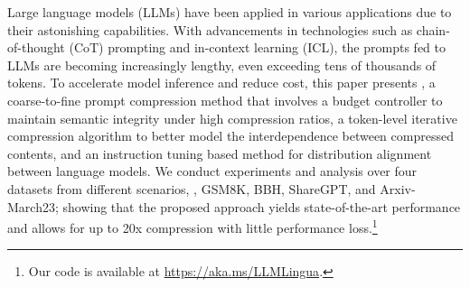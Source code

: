 Large language models (LLMs) have been applied in various applications due to their astonishing capabilities.
With advancements in technologies such as chain-of-thought (CoT) prompting and in-context learning (ICL), the prompts %
fed to LLMs are becoming increasingly lengthy, even exceeding tens of thousands of tokens.
To accelerate model inference and reduce cost, 
this paper presents \textit{\sysname{}},
a coarse-to-fine prompt compression method that involves a budget controller to maintain semantic integrity under high compression ratios, a token-level iterative compression algorithm to better model the interdependence between compressed contents, and an instruction tuning based method for distribution alignment between language models. 
We conduct experiments and analysis over four datasets from different scenarios, \ie, GSM8K, BBH, ShareGPT, and Arxiv-March23; showing that the proposed approach yields state-of-the-art performance and allows for up to 20x compression with little performance loss.\footnote{Our code is available at \url{https://aka.ms/LLMLingua}.}